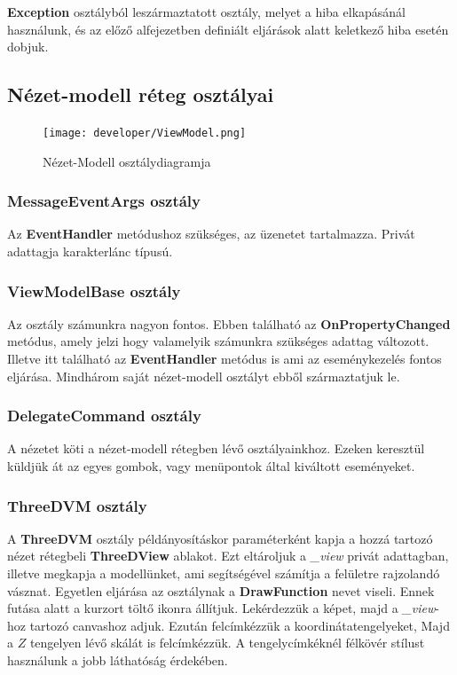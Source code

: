 				\textbf{Exception} osztályból leszármaztatott osztály, melyet a hiba elkapásánál használunk, és az előző alfejezetben definiált eljárások alatt keletkező hiba esetén dobjuk.
				 
		\subsection{Nézet-modell réteg osztályai}
			
			\begin{figure}[ht]
				\centering
				\texttt{[image: developer/ViewModel.png]}
				\caption{Nézet-Modell osztálydiagramja}
			\end{figure}
		
			\subsubsection{MessageEventArgs osztály}
			
				Az \textbf{EventHandler} metódushoz szükséges, az üzenetet tartalmazza. Privát adattagja karakterlánc típusú. 
				
			\subsubsection{ViewModelBase osztály}
			
				Az osztály számunkra nagyon fontos. Ebben található az \textbf{OnPropertyChanged} metódus, amely jelzi hogy valamelyik számunkra szükséges adattag változott. Illetve itt található az \textbf{EventHandler} metódus is ami az eseménykezelés fontos eljárása. Mindhárom saját nézet-modell osztályt ebből származtatjuk le.
				
			\subsubsection{DelegateCommand osztály}
			
				A nézetet köti a nézet-modell rétegben lévő osztályainkhoz. Ezeken keresztül küldjük át az egyes gombok, vagy menüpontok által kiváltott eseményeket. 
				
			\subsubsection{ThreeDVM osztály}
			
				A \textbf{ThreeDVM} osztály példányosításkor paraméterként kapja a hozzá tartozó nézet rétegbeli \textbf{ThreeDView} ablakot. Ezt eltároljuk a \textit{\_view} privát adattagban, illetve megkapja a modellünket, ami segítségével számítja a felületre rajzolandó vásznat. Egyetlen eljárása az osztálynak a \textbf{DrawFunction} nevet viseli. Ennek futása alatt a kurzort töltő ikonra állítjuk. Lekérdezzük a képet, majd a \textit{\_view}-hoz tartozó canvashoz adjuk. Ezután felcímkézzük a koordinátatengelyeket, Majd a $Z$ tengelyen lévő skálát is felcímkézzük. A tengelycímkéknél félkövér stílust használunk a jobb láthatóság érdekében.
				
